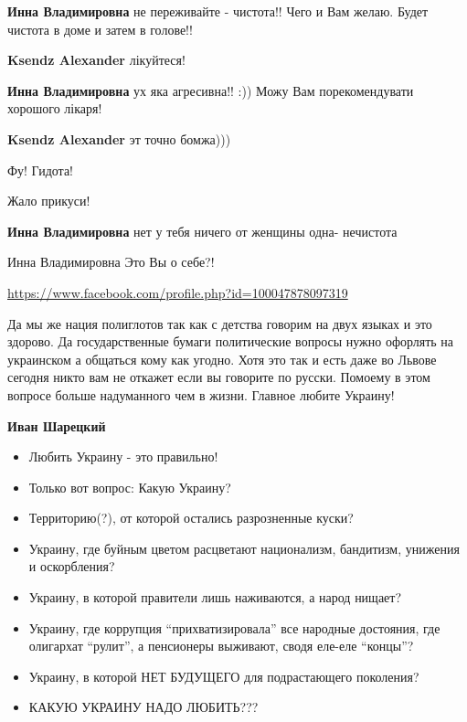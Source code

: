 \begin{itemize}
\begin{itemize}
\textbf{Инна Владимировна} не переживайте - чистота!! Чего и Вам желаю. Будет чистота в доме и затем в голове!!

\textbf{Ksendz Alexander} лікуйтеся!

\textbf{Инна Владимировна} ух яка агресивна!! :)) Можу Вам порекомендувати хорошого лікаря!

\textbf{Ksendz Alexander} эт точно бомжа)))

Фу! Гидота!

Жало прикуси!

\textbf{Инна Владимировна} нет у тебя ничего от женщины одна- нечистота

Инна Владимировна Это Вы о себе?!
\end{itemize}

\url{https://www.facebook.com/profile.php?id=100047878097319}

Да мы же нация полиглотов так как с детства говорим на двух языках и это
здорово. Да государственные бумаги политические вопросы нужно офорлять на
украинском а общаться кому как угодно. Хотя это так и есть даже во Львове
сегодня никто вам не откажет если вы говорите по русски. Помоему в этом вопросе
больше надуманного чем в жизни. Главное любите Украину!

\begin{itemize}

\textbf{Иван Шарецкий}

\begin{itemize}
  \item Любить Украину - это правильно!
  \item Только вот вопрос: Какую Украину?
  \item Территорию(?), от которой остались разрозненные куски?
  \item Украину, где буйным цветом расцветают национализм, бандитизм, унижения и оскорбления?
  \item Украину, в которой правители лишь наживаются, а народ нищает?
	\item Украину, где коррупция \enquote{прихватизировала} все народные достояния, где
	олигархат \enquote{рулит}, а пенсионеры выживают, сводя еле-еле \enquote{концы}?
  \item Украину, в которой НЕТ БУДУЩЕГО для подрастающего поколения?
  \item КАКУЮ УКРАИНУ НАДО ЛЮБИТЬ???
\end{itemize}


\end{itemize}
\end{itemize}
